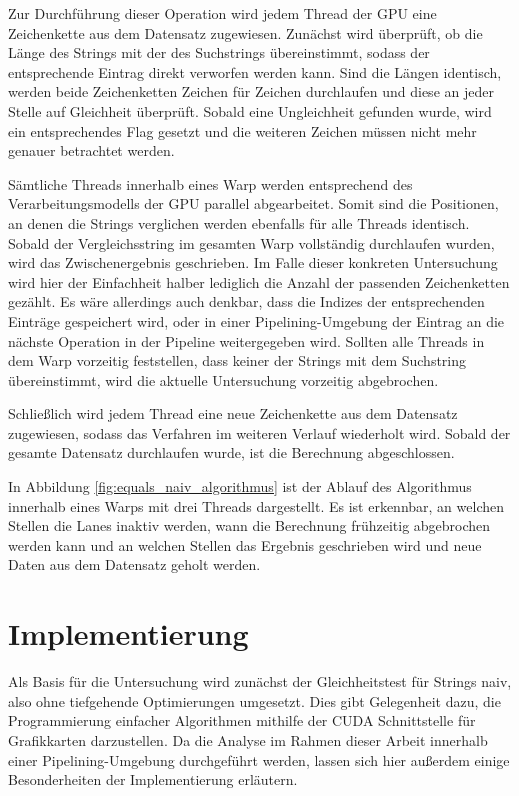 Zur Durchführung dieser Operation wird jedem Thread der GPU eine Zeichenkette aus dem Datensatz zugewiesen.
Zunächst wird überprüft, ob die Länge des Strings mit der des Suchstrings übereinstimmt, sodass der entsprechende Eintrag direkt verworfen werden kann.
Sind die Längen identisch, werden beide Zeichenketten Zeichen für Zeichen durchlaufen und diese an jeder Stelle auf Gleichheit überprüft.
Sobald eine Ungleichheit gefunden wurde, wird ein entsprechendes Flag gesetzt und die weiteren Zeichen müssen nicht mehr genauer betrachtet werden.

Sämtliche Threads innerhalb eines Warp werden entsprechend des Verarbeitungsmodells der GPU parallel abgearbeitet.
Somit sind die Positionen, an denen die Strings verglichen werden ebenfalls für alle Threads identisch.
Sobald der Vergleichsstring im gesamten Warp vollständig durchlaufen wurden, wird das Zwischenergebnis geschrieben.
Im Falle dieser konkreten Untersuchung wird hier der Einfachheit halber lediglich die Anzahl der passenden Zeichenketten gezählt.
Es wäre allerdings auch denkbar, dass die Indizes der entsprechenden Einträge gespeichert wird, oder in einer Pipelining-Umgebung der Eintrag an die nächste Operation in der Pipeline weitergegeben wird.
Sollten alle Threads in dem Warp vorzeitig feststellen, dass keiner der Strings mit dem Suchstring übereinstimmt, wird die aktuelle Untersuchung vorzeitig abgebrochen.

Schließlich wird jedem Thread eine neue Zeichenkette aus dem Datensatz zugewiesen, sodass das Verfahren im weiteren Verlauf wiederholt wird.
Sobald der gesamte Datensatz durchlaufen wurde, ist die Berechnung abgeschlossen.

In Abbildung \ref{fig:equals_naiv_algorithmus} ist der Ablauf des Algorithmus innerhalb eines Warps mit drei Threads dargestellt.
Es ist erkennbar, an welchen Stellen die Lanes inaktiv werden, wann die Berechnung frühzeitig abgebrochen werden kann und an welchen Stellen das Ergebnis geschrieben wird und neue Daten aus dem Datensatz geholt werden.

\section{Implementierung}

Als Basis für die Untersuchung wird zunächst der Gleichheitstest für Strings naiv, also ohne tiefgehende Optimierungen umgesetzt.
Dies gibt Gelegenheit dazu, die Programmierung einfacher Algorithmen mithilfe der CUDA Schnittstelle für Grafikkarten darzustellen.
Da die Analyse im Rahmen dieser Arbeit innerhalb einer Pipelining-Umgebung durchgeführt werden, lassen sich hier außerdem einige Besonderheiten der Implementierung erläutern.

